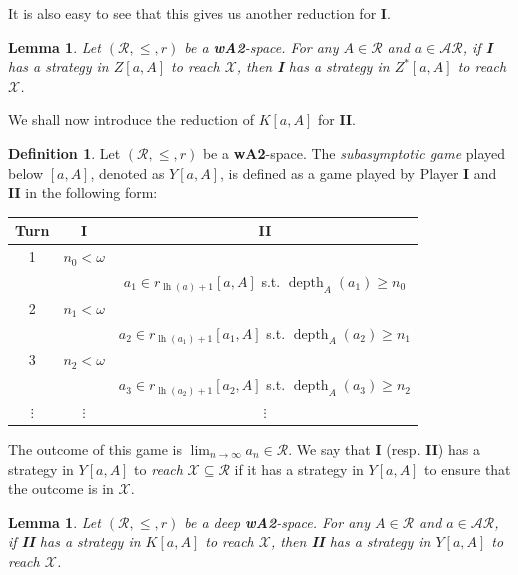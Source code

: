 \documentclass[11pt,reqno]{amsart}
\theoremstyle{plain}
\numberwithin{equation}{section}
\newtheorem{lemma}[theorem]{Lemma}
\theoremstyle{definition}
\newtheorem{definition}[theorem]{Definition}
\newcommand{\func}{\operatorname}
\newcommand{\cal}{\mathcal}
\newcommand{\X}{\cal{X}}
\newcommand{\lh}{\func{lh}}
\newcommand{\depth}{\func{depth}}
\begin{document}
It is also easy to see that this gives us another reduction for \textbf{I}.

\begin{lemma}
    Let $(\cal{R},\leq,r)$ be a \textbf{wA2}-space. For any $A \in \cal{R}$ and $a \in \cal{AR}$, if \textbf{I} has a strategy in $Z[a,A]$ to reach $\X$, then \textbf{I} has a strategy in $Z^*[a,A]$ to reach $\X$.
\end{lemma}

We shall now introduce the reduction of $K[a,A]$ for \textbf{II}. 

\begin{definition}
\label{def:reverse.fusion.game}
    Let $(\cal{R},\leq,r)$ be a \textbf{wA2}-space. The \emph{subasymptotic game} played below $[a,A]$, denoted as $Y[a,A]$, is defined as a game played by Player \textbf{I} and \textbf{II} in the following form:
    \begin{center}
        \begin{tabular}{c|c|c}
           Turn & \textbf{I} & \textbf{II} \\
            \hline
           1 & $n_0 < \omega$ & \\
            & & $a_1 \in r_{\lh(a)+1}[a,A]$ s.t. $\depth_A(a_1) \geq n_0$ \\
            \hline
           2 & $n_1 < \omega$ & \\
            & & $a_2 \in r_{\lh(a_1)+1}[a_1,A]$ s.t. $\depth_A(a_2) \geq n_1$ \\
            \hline
           3 &  $n_2 < \omega$ & \\
            & & $a_3 \in r_{\lh(a_2)+1}[a_2,A]$ s.t. $\depth_A(a_3) \geq n_2$ \\
            \hline
            $\vdots$ & $\vdots$ & $\vdots$
        \end{tabular}
    \end{center}
    The outcome of this game is $\lim_{n \to \infty} a_n \in \cal{R}$. We say that \textbf{I} (resp. \textbf{II}) has a strategy in $Y[a,A]$ to \emph{reach} $\X \subseteq \cal{R}$ if it has a strategy in $Y[a,A]$ to ensure that the outcome is in $\X$. 
\end{definition}

\begin{lemma}
    Let $(\cal{R},\leq,r)$ be a deep \textbf{wA2}-space. For any $A \in \cal{R}$ and $a \in \cal{AR}$, if \textbf{II} has a strategy in $K[a,A]$ to reach $\X$, then \textbf{II} has a strategy in $Y[a,A]$ to reach $\X$.
\end{lemma}
\end{document}
